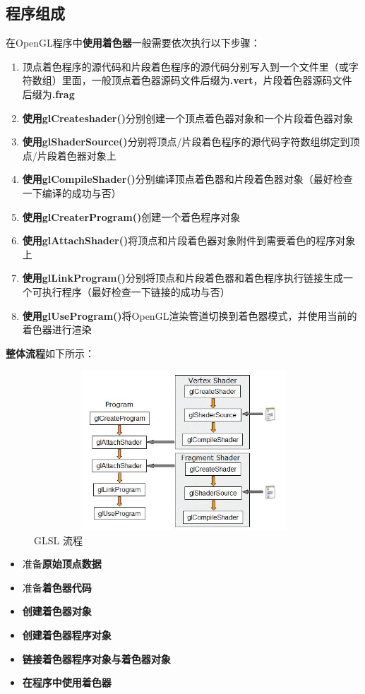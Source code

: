 \documentclass[UTF8,a4paper,8pt]{ctexbook}
\begin{document}
		\subsection{程序组成}
			在OpenGL程序中\textbf{使用着色器}一般需要依次执行以下步骤：
			\begin{enumerate}[itemindent = 1em]
				\item 顶点着色程序的源代码和片段着色程序的源代码分别写入到一个文件里（或字符数组）里面，一般顶点着色器源码文件后缀为\textbf{.vert}，片段着色器源码文件后缀为\textbf{.frag}
				\item \textbf{使用glCreateshader()}分别创建一个顶点着色器对象和一个片段着色器对象
				\item \textbf{使用glShaderSource()}分别将顶点/片段着色程序的源代码字符数组绑定到顶点/片段着色器对象上
				\item \textbf{使用glCompileShader()}分别编译顶点着色器和片段着色器对象（最好检查一下编译的成功与否）
				\item \textbf{使用glCreaterProgram()}创建一个着色程序对象
				\item \textbf{使用glAttachShader()}将顶点和片段着色器对象附件到需要着色的程序对象上
				\item \textbf{使用glLinkProgram()}分别将顶点和片段着色器和着色程序执行链接生成一个可执行程序（最好检查一下链接的成功与否）
				\item \textbf{使用glUseProgram()}将OpenGL渲染管道切换到着色器模式，并使用当前的着色器进行渲染
			\end{enumerate}	
		
			\textbf{整体流程}如下所示：
			\begin{figure}[htbp]
				\centering
				\includegraphics[width = 12cm, height = 6cm]{GLSLProcess.png}
				\caption{GLSL 流程}
				\label{GLSL}
			\end{figure}
			
			\begin{itemize}[itemindent = 1em]
				\item 准备\textbf{原始顶点数据}
				\item 准备\textbf{着色器代码}
				\item \textbf{创建着色器对象}
				\item \textbf{创建着色器程序对象}
				\item \textbf{链接着色器程序对象与着色器对象}
				\item \textbf{在程序中使用着色器}
			\end{itemize}	
\end{document}
